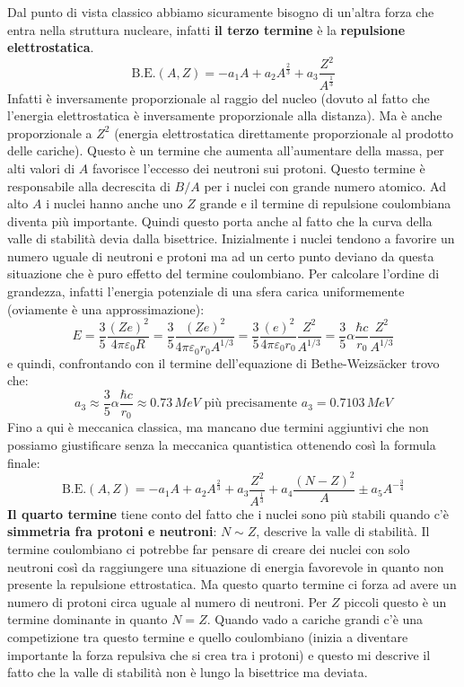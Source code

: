 Dal punto di vista classico abbiamo sicuramente bisogno di un'altra forza che entra nella struttura nucleare, infatti \textbf{il terzo termine} è la \textbf{repulsione elettrostatica}.
\begin{equation*}
    \text{B.E.}(A,Z)=-a_{1}A+a_{2}A^{\frac{2}{3}}+a_{3}{\frac {Z^2}{A^{\frac{1}{3}}}}
\end{equation*}
Infatti è inversamente proporzionale al raggio del nucleo (dovuto al fatto che l'energia elettrostatica è inversamente proporzionale alla distanza). Ma è anche proporzionale a $Z^2$ (energia elettrostatica direttamente proporzionale al prodotto delle cariche). Questo è un termine che aumenta all'aumentare della massa, per alti valori di $A$ favorisce l'eccesso dei neutroni sui protoni. Questo termine è responsabile alla decrescita di $B/A$ per i nuclei con grande numero atomico. Ad alto $A$ i nuclei hanno anche uno $Z$ grande e il termine di repulsione coulombiana diventa più importante. Quindi questo porta anche al fatto che la curva della valle di stabilità devia dalla bisettrice. Inizialmente i nuclei tendono a favorire un numero uguale di neutroni e protoni ma ad un certo punto deviano da questa situazione che è puro effetto del termine coulombiano. Per calcolare l'ordine di grandezza, infatti l'energia potenziale di una sfera carica uniformemente (oviamente è una approssimazione):
\begin{equation*}
    E=\frac{3}{5}\frac{(Ze)^2}{4\pi\varepsilon_0 R}=\frac{3}{5}\frac{(Ze)^2}{4\pi\varepsilon_0 r_0A^{1/3}}=\frac{3}{5}\frac{(e)^2}{4\pi\varepsilon_0 r_0}\frac{Z^2}{A^{1/3}}=\frac{3}{5}\alpha\frac{\hbar c}{r_0}\frac{Z^2}{A^{1/3}}
\end{equation*}
e quindi, confrontando con il termine dell'equazione di Bethe-Weizs\"acker trovo che:
\begin{equation*}
    a_3\approx\frac{3}{5}\alpha\frac{\hbar c}{r_0} \approx 0.73\,MeV \text{ più precisamente } a_3=0.7103\,MeV
\end{equation*}
Fino a qui è meccanica classica, ma mancano due termini aggiuntivi che non possiamo giustificare senza la meccanica quantistica ottenendo così la formula finale:
\begin{equation*}
    \text{B.E.}(A,Z)=-a_{1}A+a_{2}A^{\frac{2}{3}}+a_{3}{\frac {Z^2}{A^{\frac{1}{3}}}}+a_{4}{\frac {(N-Z)^{2}}{A}}\pm a_5 A^{-\frac{3}{4}}
\end{equation*}
\textbf{Il quarto termine} tiene conto del fatto che i nuclei sono più stabili quando c'è \textbf{simmetria fra protoni e neutroni}: $N\sim Z$, descrive la valle di stabilità. Il termine coulombiano ci potrebbe far pensare di creare dei nuclei con solo neutroni così da raggiungere una situazione di energia favorevole in quanto non presente la repulsione ettrostatica. Ma questo quarto termine ci forza ad avere un numero di protoni circa uguale al numero di neutroni. Per $Z$ piccoli questo è un termine dominante in quanto $N=Z$. Quando vado a cariche grandi c'è una competizione tra questo termine e quello coulombiano (inizia a diventare importante la forza repulsiva che si crea tra i protoni) e questo mi descrive il fatto che la valle di stabilità non è lungo la bisettrice ma deviata.

